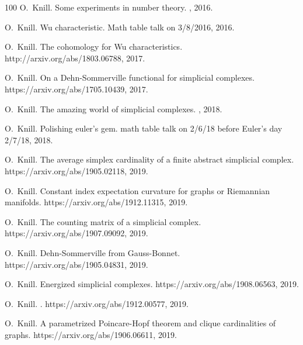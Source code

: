 \documentclass[12pt]{amsart}
\begin{document}
\begin{thebibliography}{100}
O.~Knill.
\newblock Some experiments in number theory.
, 2016.

O.~Knill.
\newblock Wu characteristic.
\newblock Math table talk on 3/8/2016, 2016.

O.~Knill.
\newblock The cohomology for {W}u characteristics.
\newblock {\\}http://arxiv.org/abs/1803.06788, 2017.

O.~Knill.
\newblock On a {D}ehn-{S}ommerville functional for simplicial complexes.
\newblock {\\}https://arxiv.org/abs/1705.10439, 2017.

O.~Knill.
\newblock The amazing world of simplicial complexes.
, 2018.

O.~Knill.
\newblock Polishing euler's gem.
\newblock math table talk on 2/6/18 before Euler's day 2/7/18, 2018.

O.~Knill.
\newblock The average simplex cardinality of a finite abstract simplicial
  complex.
\newblock https://arxiv.org/abs/1905.02118, 2019.

O.~Knill.
\newblock Constant index expectation curvature for graphs or {R}iemannian
  manifolds.
\newblock https://arxiv.org/abs/1912.11315, 2019.

O.~Knill.
\newblock The counting matrix of a simplicial complex.
\newblock {\\}https://arxiv.org/abs/1907.09092, 2019.

O.~Knill.
\newblock Dehn-{S}ommerville from {G}auss-{B}onnet.
\newblock {\\}https://arxiv.org/abs/1905.04831, 2019.

O.~Knill.
\newblock Energized simplicial complexes.
\newblock https://arxiv.org/abs/1908.06563, 2019.

O.~Knill.
.
\newblock https://arxiv.org/abs/1912.00577, 2019.

O.~Knill.
\newblock A parametrized {P}oincare-{H}opf theorem and clique cardinalities of
  graphs.
\newblock {\\}https://arxiv.org/abs/1906.06611, 2019.


\end{thebibliography}
\end{document}

